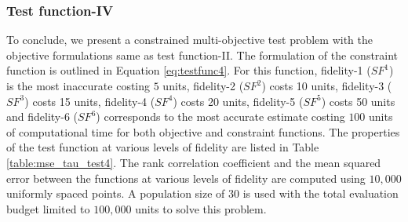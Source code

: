 \subsubsection{Test function-IV}

To conclude, we present a constrained multi-objective test problem with the objective formulations same as test function-II. The formulation of the constraint function is outlined in Equation \ref{eq:testfunc4}. For this function, fidelity-1 ($SF^1$) is the most inaccurate costing $5$ units, fidelity-2 ($SF^2$) costs 10 units, fidelity-3 ($SF^3$) costs 15 units, fidelity-4 ($SF^4$) costs 20 units, fidelity-5 ($SF^5$) costs 50 units and fidelity-6 ($SF^6$) corresponds to the most accurate estimate costing $100$ units of computational time for both objective and constraint functions. The properties of the test function at various levels of fidelity are listed in Table \ref{table:mse_tau_test4}. The rank correlation coefficient and the mean squared error between the functions at various levels of fidelity are computed using $10,000$ uniformly spaced points. A population size of $30$ is used with the total evaluation budget limited to $100,000$ units to solve this problem.

